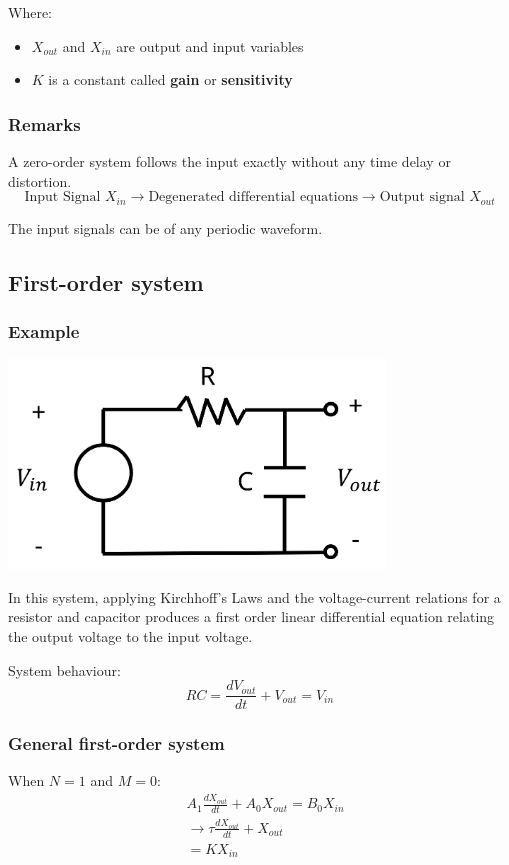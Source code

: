 \documentclass[11pt]{article}
\begin{document}
Where:
\begin{itemize}
\item \(X_{out}\) and \(X_{in}\) are output and input variables
\item \(K\) is a constant called \textbf{gain} or \textbf{sensitivity}
\end{itemize}
\subsubsection{Remarks}
\label{sec:org5427cf1}
A zero-order system follows the input exactly without any time delay or distortion.
\[\text{Input Signal } X_{in} \rightarrow \text{Degenerated differential equations} \rightarrow \text{Output signal } X_{out}\]

The input signals can be of any periodic waveform.
\subsection{First-order system}
\label{sec:org7dee199}

\subsubsection{Example}
\label{sec:orga42213f}
\begin{center}
\includegraphics[height=15em]{./images/resistor-capacitor-circuit.png}
\end{center}

In this system, applying Kirchhoff's Laws and the voltage-current relations for a resistor and capacitor produces a first order linear differential equation relating the output voltage to the input voltage.

System behaviour:
\[RC = \frac{dV_{out}}{dt} + V_{out} = V_{in}\]
\subsubsection{General first-order system}
\label{sec:org5be93dc}
When \(N = 1\) and \(M = 0\):
\begin{align*}
&A_1 \frac{dX_{out}}{dt} + A_0 X_{out} = B_0 X_{in} \\
&\rightarrow \tau \frac{dX_{out}}{dt} + X_{out} \\
&= KX_{in}
\end{align*}
\end{document}
